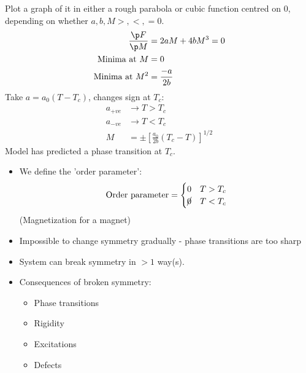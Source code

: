 \documentclass[a4paper, 11pt, normalem]{report}
\begin{document}
Plot a graph of it in either a rough parabola or cubic function centred on 0, depending on whether $a,b,M >,<,= 0$.
\begin{align}
    \frac{\p F}{\p M} &= 2aM + 4bM^3 = 0 \\
    \text{Minima at } M &= 0 \\
    \text{Minima at } M^2 &= \frac{-a}{2b}
\end{align}
Take $a = a_0(T-T_c)$, changes sign at $T_c$:
\begin{align}
    a_{+ve} &\to T>T_c \\
    a_{-ve} &\to T<T_c \\
    M &= \pm \left[\frac{a_0}{2b}(T_c-T)\right]^{1/2}
\end{align}
Model has predicted a phase transition at $T_c$.

\begin{itemize}
    \item We define the 'order parameter':
        \begin{equation}
            \text{Order parameter} = \begin{cases} 0 & T > T_c \\ \cancel{0} & T < T_c \end{cases}
        \end{equation}
        (Magnetization for a magnet)
    \item Impossible to change symmetry gradually - phase transitions are too sharp
    \item System can break symmetry in $> 1$ way(s).
    \item Consequences of broken symmetry:
        \begin{itemize}
            \item Phase transitions
            \item Rigidity
            \item Excitations
            \item Defects
        \end{itemize}
\end{itemize}

\chapter{}

\chapter{}
\end{document}
